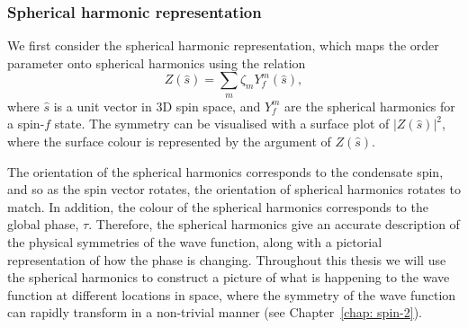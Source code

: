 \subsubsection{Spherical harmonic representation}
We first consider the spherical harmonic representation, which maps the
order parameter onto spherical harmonics using the relation
\begin{equation}\label{eq: spherical-harmonics}
    Z(\hat{s}) = \sum_m\zeta_m Y_f^m(\hat{s}),
\end{equation}
where \(\hat{s}\) is a unit vector in 3D spin space, and \(Y_f^m \) are the
spherical harmonics for a spin-\(f\) state.
The symmetry can be visualised with a surface plot of \(|Z(\hat{s})|^2\),
where the surface colour is represented by the argument of \(Z(\hat{s})\).

The orientation of the spherical harmonics corresponds to the condensate spin,
and so as the spin vector rotates, the orientation of spherical harmonics
rotates to match.
In addition, the colour of the spherical harmonics corresponds to the global
phase, \( \tau \).
Therefore, the spherical harmonics give an accurate description of the
physical symmetries of the wave function, along with a pictorial representation
of how the phase is changing.
Throughout this thesis we will use the spherical harmonics to construct a
picture of what is happening to the wave function at different locations in
space, where the symmetry of the wave function can rapidly transform in a
non-trivial manner (see Chapter~\ref{chap: spin-2}).

